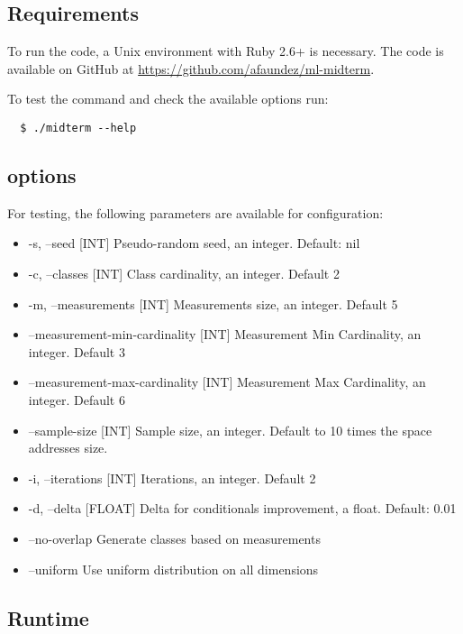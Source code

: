\documentclass[letterpaper, conference]{IEEEtran}
\begin{document}
\subsection{Requirements}

To run the code, a Unix environment with Ruby 2.6+ is necessary. The code is available on GitHub at \url{https://github.com/afaundez/ml-midterm}.

To test the command and check the available options run:

\begin{verbatim}
  $ ./midterm --help
\end{verbatim}

\subsection{options}

For testing, the following parameters are available for configuration:

\begin{itemize}
    \item-s, --seed [INT]                 Pseudo-random seed, an integer. Default: nil
    \item-c, --classes [INT]              Class cardinality, an integer. Default 2
    \item-m, --measurements [INT]         Measurements size, an integer. Default 5
    \item    --measurement-min-cardinality [INT]
                                     Measurement Min Cardinality, an integer. Default 3
    \item    --measurement-max-cardinality [INT]
                                     Measurement Max Cardinality, an integer. Default 6
    \item    --sample-size [INT]          Sample size, an integer. Default to 10 times the  space addresses size.
    \item-i, --iterations [INT]           Iterations, an integer. Default 2
    \item-d, --delta [FLOAT]              Delta for conditionals improvement, a float. Default: 0.01
    \item    --no-overlap                 Generate classes based on measurements
    \item    --uniform                    Use uniform distribution on all dimensions
\end{itemize}

\subsection{Runtime}
\end{document}
